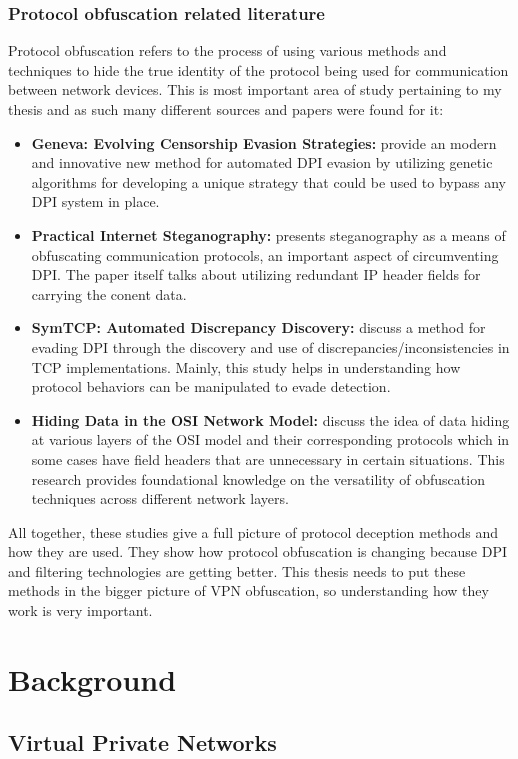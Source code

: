 \documentclass[12pt, fleqn, a4paper]{article}
\begin{document}
\subsubsection{Protocol obfuscation related literature}
Protocol obfuscation refers to the process of using various methods and techniques to hide the true identity of the protocol being used for communication between network devices. This is most important area of study pertaining to my thesis and as such many different sources and papers were found for it:
\begin{itemize}
  \item \textbf{Geneva: Evolving Censorship Evasion Strategies:} \cite{Geneva} provide an modern and innovative new method for automated DPI evasion by utilizing genetic algorithms for developing a unique strategy that could be used to bypass any DPI system in place.
  \item \textbf{Practical Internet Steganography:} \cite{Stega} presents steganography as a means of obfuscating communication protocols, an important aspect of circumventing DPI. The paper itself talks about utilizing redundant IP header fields for carrying the conent data.
  \item \textbf{SymTCP: Automated Discrepancy Discovery:} \cite{symtcp} discuss a method for evading DPI through the discovery and use of discrepancies/inconsistencies in TCP implementations. Mainly, this study helps in understanding how protocol behaviors can be manipulated to evade detection.
  \item \textbf{Hiding Data in the OSI Network Model:} \cite{osisteg} discuss the idea of data hiding at various layers of the OSI model and their corresponding protocols which in some cases have field headers that are unnecessary in certain situations. This research provides foundational knowledge on the versatility of obfuscation techniques across different network layers.
\end{itemize}
All together, these studies give a full picture of protocol deception methods and how they are used. They show how protocol obfuscation is changing because DPI and filtering technologies are getting better. This thesis needs to put these methods in the bigger picture of VPN obfuscation, so understanding how they work is very important.
\section{Background}
\subsection{Virtual Private Networks}
\end{document}
